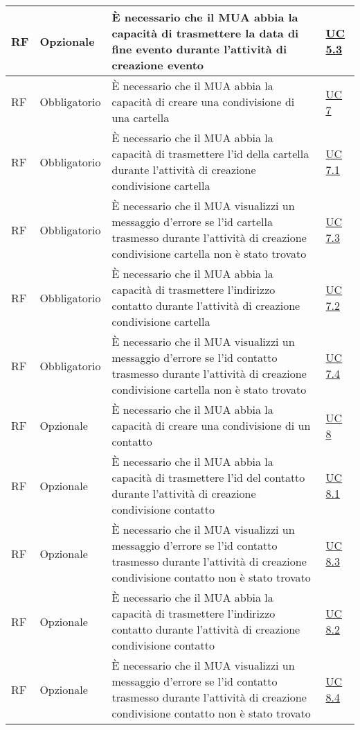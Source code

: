 \begin{longtable}{*{1}{>{\centering\arraybackslash}p{1.5cm}}*{1}{>{\centering\arraybackslash}p{2.5cm}}p{6cm}*{1}{>{\centering\arraybackslash}p{3cm}}}
    \\\hline
    RF & Opzionale & È necessario che il MUA abbia la capacità di trasmettere la data di fine evento durante l'attività di creazione evento & \hyperref[sec:UC5.3]{UC 5.3}
    \\\hline
    RF & Obbligatorio & È necessario che il MUA abbia la capacità di creare una condivisione di una cartella & \hyperref[sec:UC7]{UC 7}
    \\\hline
    RF & Obbligatorio & È necessario che il MUA abbia la capacità di trasmettere l'id della cartella durante l'attività di creazione condivisione cartella & \hyperref[sec:UC7.1]{UC 7.1}
    \\\hline
    RF & Obbligatorio & È necessario che il MUA visualizzi un messaggio d'errore se l'id cartella trasmesso durante l'attività di creazione condivisione cartella non è stato trovato & \hyperref[sec:UC7.3]{UC 7.3}
    \\\hline
    RF & Obbligatorio & È necessario che il MUA abbia la capacità di trasmettere l'indirizzo contatto durante l'attività di creazione condivisione cartella & \hyperref[sec:UC7.2]{UC 7.2}
    \\\hline
    RF & Obbligatorio & È necessario che il MUA visualizzi un messaggio d'errore se l'id contatto trasmesso durante l'attività di creazione condivisione cartella non è stato trovato & \hyperref[sec:UC7.4]{UC 7.4}
    \\\hline
    RF & Opzionale & È necessario che il MUA abbia la capacità di creare una condivisione di un contatto & \hyperref[sec:UC8]{UC 8}
    \\\hline
    RF & Opzionale & È necessario che il MUA abbia la capacità di trasmettere l'id del contatto durante l'attività di creazione condivisione contatto & \hyperref[sec:UC8.1]{UC 8.1}
    \\\hline
    RF & Opzionale & È necessario che il MUA visualizzi un messaggio d'errore se l'id contatto trasmesso durante l'attività di creazione condivisione contatto non è stato trovato & \hyperref[sec:UC8.3]{UC 8.3}
    \\\hline
    RF & Opzionale & È necessario che il MUA abbia la capacità di trasmettere l'indirizzo contatto durante l'attività di creazione condivisione contatto & \hyperref[sec:UC8.2]{UC 8.2}
    \\\hline
    RF & Opzionale & È necessario che il MUA visualizzi un messaggio d'errore se l'id contatto trasmesso durante l'attività di creazione condivisione contatto non è stato trovato & \hyperref[sec:UC8.4]{UC 8.4}

\end{longtable}
